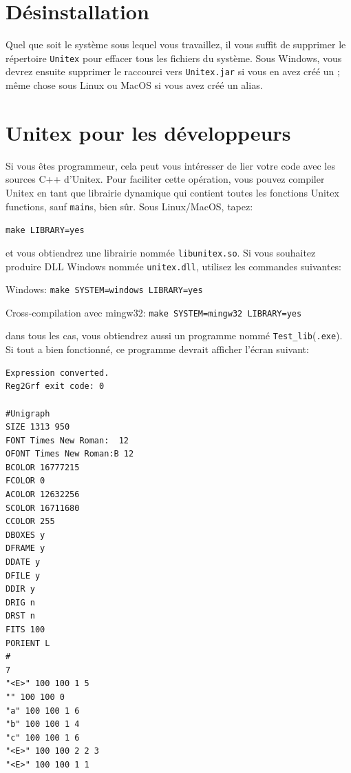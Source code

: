 \section{Désinstallation}
Quel que soit le système sous lequel vous travaillez, il vous suffit de supprimer le répertoire
\verb+Unitex+ pour effacer tous les fichiers du système. Sous Windows, vous devrez ensuite supprimer
le raccourci vers \verb+Unitex.jar+  si vous en avez créé un ;
même chose sous Linux ou MacOS si vous avez créé un alias.


\section{Unitex pour les développeurs}
\label{section-unitex-developpers}
Si vous êtes programmeur, cela peut vous intéresser de lier votre code avec les sources C++
d'Unitex. Pour faciliter cette opération, vous pouvez compiler Unitex en tant que librairie
dynamique qui contient toutes les fonctions Unitex functions, sauf \verb+main+s, bien sûr. Sous
Linux/MacOS, tapez:

\bigskip
\verb+make LIBRARY=yes+

\bigskip
\noindent et vous obtiendrez une librairie nommée \verb+libunitex.so+. Si vous souhaitez produire 
DLL Windows nommée \verb+unitex.dll+, utilisez les commandes suivantes:

\bigskip
Windows: \verb+make SYSTEM=windows LIBRARY=yes+

Cross-compilation avec mingw32: \verb+make SYSTEM=mingw32 LIBRARY=yes+

\bigskip
\noindent dans tous les cas, vous obtiendrez aussi un programme nommé
\verb+Test_lib+(\verb+.exe+). Si tout a bien fonctionné, ce programme devrait afficher l'écran
suivant:

\begin{verbatim}
Expression converted.
Reg2Grf exit code: 0

#Unigraph
SIZE 1313 950
FONT Times New Roman:  12
OFONT Times New Roman:B 12
BCOLOR 16777215
FCOLOR 0
ACOLOR 12632256
SCOLOR 16711680
CCOLOR 255
DBOXES y
DFRAME y
DDATE y
DFILE y
DDIR y
DRIG n
DRST n
FITS 100
PORIENT L
#
7
"<E>" 100 100 1 5
"" 100 100 0
"a" 100 100 1 6
"b" 100 100 1 4
"c" 100 100 1 6
"<E>" 100 100 2 2 3
"<E>" 100 100 1 1
\end{verbatim}
